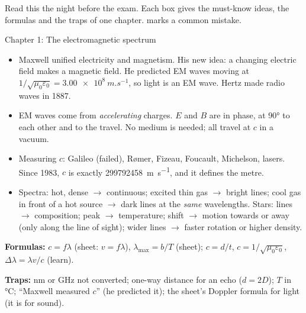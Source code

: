 \label{bm:summary}

Read this the night before the exam. Each box gives the must-know ideas, the formulas and the
traps of one chapter. \textcolor{hscmistake}{\faTimes} marks a common mistake.

\begin{summarybox}[fontupper=\small]{Chapter 1: The electromagnetic spectrum}
\begin{itemize}[itemsep=0pt, topsep=2pt]
  \item Maxwell unified electricity and magnetism. His new idea: a changing electric field
        makes a magnetic field. He predicted EM waves moving at
        $1/\sqrt{\mu_0\varepsilon_0} = \qty{3.00e8}{m.s^{-1}}$, so light is an EM wave. Hertz
        made radio waves in 1887.
  \item EM waves come from \emph{accelerating} charges. $E$ and $B$ are in phase, at \ang{90}
        to each other and to the travel. No medium is needed; all travel at $c$ in a vacuum.
  \item Measuring $c$: Galileo (failed), Rømer, Fizeau, Foucault, Michelson, lasers. Since
        1983, $c$ is exactly \qty{299792458}{m.s^{-1}}, and it defines the metre.
  \item Spectra: hot, dense $\to$ continuous; excited thin gas $\to$ bright lines; cool gas in
        front of a hot source $\to$ dark lines at the \emph{same} wavelengths. Stars: lines
        $\to$ composition; peak $\to$ temperature; shift $\to$ motion towards or away (only
        along the line of sight); wider lines $\to$ faster rotation or higher density.
\end{itemize}
\textbf{Formulas:} $c = f\lambda$ (sheet: $v = f\lambda$), $\lambda_\mathrm{max} = b/T$
(sheet); $c = d/t$, $c = 1/\sqrt{\mu_0\varepsilon_0}$, $\Delta\lambda = \lambda v/c$ (learn).
\par\textbf{Traps:} \textcolor{hscmistake}{\faTimes} \si{nm} or \si{GHz} not converted;
\textcolor{hscmistake}{\faTimes} one-way distance for an echo ($d = 2D$);
\textcolor{hscmistake}{\faTimes} $T$ in \si{\degreeCelsius}; \textcolor{hscmistake}{\faTimes}
``Maxwell measured $c$'' (he predicted it); \textcolor{hscmistake}{\faTimes} the sheet's
Doppler formula for light (it is for sound).
\end{summarybox}

